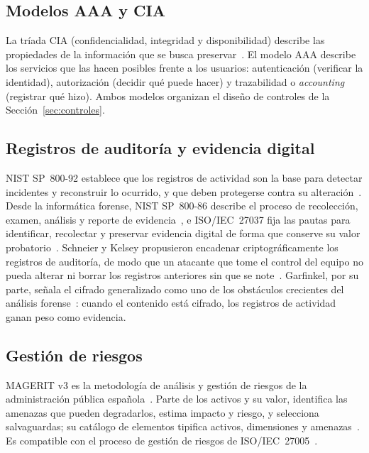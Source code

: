 \documentclass[conference]{IEEEtran}
\begin{document}
\subsection{Modelos AAA y CIA}
La tríada CIA (confidencialidad, integridad y disponibilidad) describe las propiedades de la información que se busca preservar~\cite{iso27001}. El modelo AAA describe los servicios que las hacen posibles frente a los usuarios: autenticación (verificar la identidad), autorización (decidir qué puede hacer) y trazabilidad o \textit{accounting} (registrar qué hizo). Ambos modelos organizan el diseño de controles de la Sección~\ref{sec:controles}.

\subsection{Registros de auditoría y evidencia digital}
NIST SP~800-92 establece que los registros de actividad son la base para detectar incidentes y reconstruir lo ocurrido, y que deben protegerse contra su alteración~\cite{sp80092}. Desde la informática forense, NIST SP~800-86 describe el proceso de recolección, examen, análisis y reporte de evidencia~\cite{sp80086}, e ISO/IEC~27037 fija las pautas para identificar, recolectar y preservar evidencia digital de forma que conserve su valor probatorio~\cite{iso27037}. Schneier y Kelsey propusieron encadenar criptográficamente los registros de auditoría, de modo que un atacante que tome el control del equipo no pueda alterar ni borrar los registros anteriores sin que se note~\cite{schneier}. Garfinkel, por su parte, señala el cifrado generalizado como uno de los obstáculos crecientes del análisis forense~\cite{garfinkel}: cuando el contenido está cifrado, los registros de actividad ganan peso como evidencia.

\subsection{Gestión de riesgos}
MAGERIT v3 es la metodología de análisis y gestión de riesgos de la administración pública española~\cite{magerit1}. Parte de los activos y su valor, identifica las amenazas que pueden degradarlos, estima impacto y riesgo, y selecciona salvaguardas; su catálogo de elementos tipifica activos, dimensiones y amenazas~\cite{magerit2}. Es compatible con el proceso de gestión de riesgos de ISO/IEC~27005~\cite{iso27005}.
\end{document}
